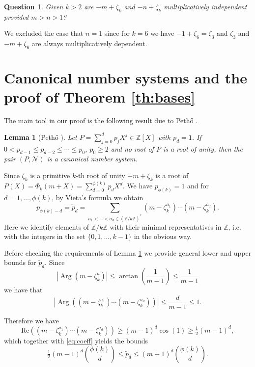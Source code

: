 \documentclass{amsart}
\theoremstyle{plain}
\numberwithin{equation}{section}
\newtheorem{lemma}[thm]{Lemma}
\newtheorem{question}[thm]{Question}
\theoremstyle{remark}
\begin{document}
\begin{question}
 Given $k>2$ are $-m+\zeta_k$ and $-n+\zeta_k$ multiplicatively independent provided $m>n>1$?
\end{question}

We excluded the case that $n=1$ since for $k=6$ we have $-1+\zeta_6=\zeta_3$ and $\zeta_3$ and $-m+\zeta_6$ are always multiplicatively 
dependent.

\section{Canonical number systems and the proof of Theorem \ref{th:bases}}

The main tool in our proof is the following result due to Peth{\H o}
\cite{pethoe1991:polynomial_transformation_and}.

\begin{lemma}[Peth\H{o} {\cite[Theorem 7.1]{pethoe1991:polynomial_transformation_and}}]\label{lem:pethoe}
  Let $P=\sum_{j=0}^dp_jX^j\in{{\mathbb Z}}[X]$ with $p_d=1$. If $0<p_{d-1}\leq
  p_{d-2}\leq\cdots\leq p_0$, $p_0\geq2$ and no root of $P$ is a root
  of unity, then the pair $(P,\mathcal{N})$ is a canonical number
  system.
\end{lemma}

Since $\zeta_k$ is a primitive $k$-th root of unity $-m+\zeta_k$ is a
root of $P(X)=\Phi_k(m+X)=\sum_{d=0}^{\phi(k)}p_dX^d$. We have
$p_{\phi(k)}=1$ and for $d=1,\ldots,\phi(k)$, by Vieta's
formula we obtain
\begin{equation}\label{eq:coeff} p_{\phi(k)-d}=\tilde
  p_d=\sum_{a_1<\cdots<a_d\in({{\mathbb Z}}/k{{\mathbb Z}})^*}(m-\zeta_k^{a_1})\cdots(m-\zeta_k^{a_d}).
\end{equation}
Here we identify elements of ${{\mathbb Z}}/k{{\mathbb Z}}$ with their minimal
representatives in ${{\mathbb Z}}$, i.e. with the integers in the set
$\{0,1,\dots, k-1\}$ in the obvious way. 

Before checking the requirements of Lemma \ref{lem:pethoe} we provide
general lower and upper bounds for $\tilde p_{d}$. Since
$$\left|\operatorname{Arg}(m-\zeta_k^a)\right|\leq \arctan\left(\frac 1{m-1}\right)\leq\frac1{m-1}$$
we have that
\[\left|\operatorname{Arg}\left((m-\zeta_k^{a_1})\cdots(m-\zeta_k^{a_d})\right)\right|
\leq\frac d{m-1}\leq 1.\]

Therefore we have
$$\mathrm{Re}\left((m-\zeta_k^{a_1})\cdots(m-\zeta_k^{a_d})\right)\geq (m-1)^d \cos(1)\geq \tfrac12 (m-1)^d,$$
which together with \eqref{eq:coeff} yields the bounds
\begin{equation}\label{eq:bounds}\tfrac12(m-1)^d\binom{\phi(k)}{d}\leq\tilde
  p_d\leq(m+1)^d\binom{\phi(k)}{d}.\end{equation}
\end{document}
